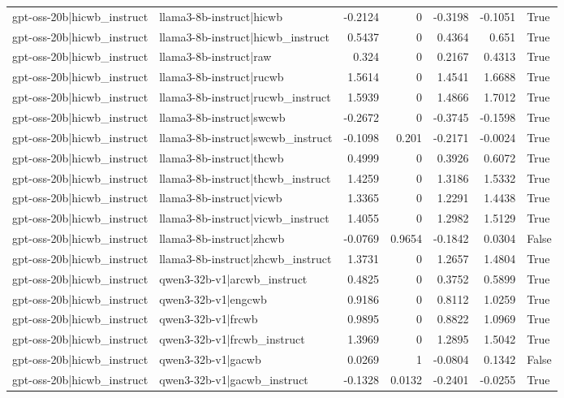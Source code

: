 \begin{table}
\begin{tabular}{l l r r r r l}
gpt-oss-20b|hicwb_instruct & llama3-8b-instruct|hicwb & -0.2124 & 0 & -0.3198 & -0.1051 & True \\
gpt-oss-20b|hicwb_instruct & llama3-8b-instruct|hicwb_instruct & 0.5437 & 0 & 0.4364 & 0.651 & True \\
gpt-oss-20b|hicwb_instruct & llama3-8b-instruct|raw & 0.324 & 0 & 0.2167 & 0.4313 & True \\
gpt-oss-20b|hicwb_instruct & llama3-8b-instruct|rucwb & 1.5614 & 0 & 1.4541 & 1.6688 & True \\
gpt-oss-20b|hicwb_instruct & llama3-8b-instruct|rucwb_instruct & 1.5939 & 0 & 1.4866 & 1.7012 & True \\
gpt-oss-20b|hicwb_instruct & llama3-8b-instruct|swcwb & -0.2672 & 0 & -0.3745 & -0.1598 & True \\
gpt-oss-20b|hicwb_instruct & llama3-8b-instruct|swcwb_instruct & -0.1098 & 0.201 & -0.2171 & -0.0024 & True \\
gpt-oss-20b|hicwb_instruct & llama3-8b-instruct|thcwb & 0.4999 & 0 & 0.3926 & 0.6072 & True \\
gpt-oss-20b|hicwb_instruct & llama3-8b-instruct|thcwb_instruct & 1.4259 & 0 & 1.3186 & 1.5332 & True \\
gpt-oss-20b|hicwb_instruct & llama3-8b-instruct|vicwb & 1.3365 & 0 & 1.2291 & 1.4438 & True \\
gpt-oss-20b|hicwb_instruct & llama3-8b-instruct|vicwb_instruct & 1.4055 & 0 & 1.2982 & 1.5129 & True \\
gpt-oss-20b|hicwb_instruct & llama3-8b-instruct|zhcwb & -0.0769 & 0.9654 & -0.1842 & 0.0304 & False \\
gpt-oss-20b|hicwb_instruct & llama3-8b-instruct|zhcwb_instruct & 1.3731 & 0 & 1.2657 & 1.4804 & True \\
gpt-oss-20b|hicwb_instruct & qwen3-32b-v1|arcwb_instruct & 0.4825 & 0 & 0.3752 & 0.5899 & True \\
gpt-oss-20b|hicwb_instruct & qwen3-32b-v1|engcwb & 0.9186 & 0 & 0.8112 & 1.0259 & True \\
gpt-oss-20b|hicwb_instruct & qwen3-32b-v1|frcwb & 0.9895 & 0 & 0.8822 & 1.0969 & True \\
gpt-oss-20b|hicwb_instruct & qwen3-32b-v1|frcwb_instruct & 1.3969 & 0 & 1.2895 & 1.5042 & True \\
gpt-oss-20b|hicwb_instruct & qwen3-32b-v1|gacwb & 0.0269 & 1 & -0.0804 & 0.1342 & False \\
gpt-oss-20b|hicwb_instruct & qwen3-32b-v1|gacwb_instruct & -0.1328 & 0.0132 & -0.2401 & -0.0255 & True \\

\end{tabular}
\end{table}
